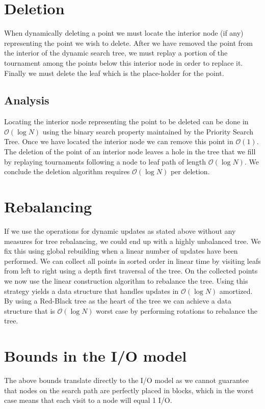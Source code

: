 \documentclass[twoside,11pt,openright]{report}
\begin{document}
\section{Deletion}

When dynamically deleting a point we must locate the interior node (if any) representing the point we wish to delete. After we have removed the point from the interior of the dynamic search tree, we must replay a portion of the tournament among the points below this interior node in order to replace it. Finally we must delete the leaf which is the place-holder for the point.

\subsection*{Analysis}
Locating the interior node representing the point to be deleted can be done in $\mathcal{O}(\log N)$ using the binary search property maintained by the Priority Search Tree. Once we have located the interior node we can remove this point in $\mathcal{O}(1)$. The deletion of the point of an interior node leaves a hole in the tree that we fill by replaying tournaments following a node to leaf path of length $\mathcal{O}(\log N)$. We conclude the deletion algorithm requires $\mathcal{O}(\log N)$ per deletion.


\section{Rebalancing}
If we use the operations for dynamic updates as stated above without any measures for tree rebalancing, we could end up with a highly unbalanced tree. We fix this using global rebuilding when a linear number of updates have been performed. We can collect all points in sorted order in linear time by visiting leafs from left to right using a depth first traversal of the tree. On the collected points we now use the linear construction algorithm to rebalance the tree. Using this strategy yields a data structure that handles updates in $\mathcal{O}(\log N)$ amortized. By using a Red-Black tree as the heart of the tree we can achieve a data structure that is $\mathcal{O}(\log N)$ worst case by performing rotations to rebalance the tree.

\section{Bounds in the I/O model}
The above bounds translate directly to the I/O model as we cannot guarantee that nodes on the search path are perfectly placed in blocks, which in the worst case means that each visit to a node will equal 1 I/O.
\end{document}
